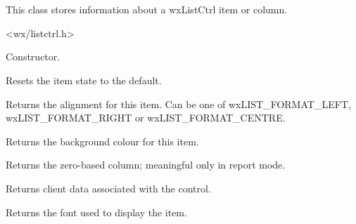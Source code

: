 \section{}\label{wxlistitem}

This class stores information about a wxListCtrl item or column.




<wx/listctrl.h>


\label{wxlistitemwxlistitem}


Constructor.

\label{wxlistitemclear}


Resets the item state to the default.

\label{wxlistitemgetalign}


Returns the alignment for this item. Can be one of
wxLIST\_FORMAT\_LEFT, wxLIST\_FORMAT\_RIGHT or wxLIST\_FORMAT\_CENTRE.

\label{wxlistitemgetbackgroundcolour}


Returns the background colour for this item.

\label{wxlistitemgetcolumn}


Returns the zero-based column; meaningful only in report mode.

\label{wxlistitemgetdata}


Returns client data associated with the control.

\label{wxlistitemgetfont}


Returns the font used to display the item.

